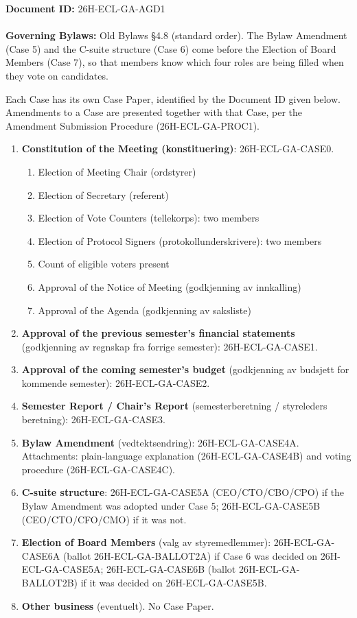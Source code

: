 \documentclass{../../../Common/Latex/Templates/rapport}
\date{\meetingdate, \meetingtime}
\begin{document}
\makecoverpage
\reportmainmatter

\noindent\textbf{Document ID:} 26H-ECL-GA-AGD1\\
\meetingline\\
\textbf{Governing Bylaws:} Old Bylaws \S4.8 (standard order). The Bylaw Amendment (Case 5) and the C-suite structure (Case 6) come before the Election of Board Members (Case 7), so that members know which four roles are being filled when they vote on candidates.

Each Case has its own Case Paper, identified by the Document ID given below. Amendments to a Case are presented together with that Case, per the Amendment Submission Procedure (26H-ECL-GA-PROC1).

\begin{enumerate}[label={\textbf{Case \arabic*.}}, leftmargin=*, itemsep=0.4em]
  \item \textbf{Constitution of the Meeting (konstituering)}: 26H-ECL-GA-CASE0.
        \begin{enumerate}[label=\alph*.]
          \item Election of Meeting Chair (ordstyrer)
          \item Election of Secretary (referent)
          \item Election of Vote Counters (tellekorps): two members
          \item Election of Protocol Signers (protokollunderskrivere): two members
          \item Count of eligible voters present
          \item Approval of the Notice of Meeting (godkjenning av innkalling)
          \item Approval of the Agenda (godkjenning av saksliste)
        \end{enumerate}
  \item \textbf{Approval of the previous semester's financial statements} (godkjenning av regnskap fra forrige semester): 26H-ECL-GA-CASE1.
  \item \textbf{Approval of the coming semester's budget} (godkjenning av budsjett for kommende semester): 26H-ECL-GA-CASE2.
  \item \textbf{Semester Report / Chair's Report} (semesterberetning / styreleders beretning): 26H-ECL-GA-CASE3.
  \item \textbf{Bylaw Amendment} (vedtektsendring): 26H-ECL-GA-CASE4A. Attachments: plain-language explanation (26H-ECL-GA-CASE4B) and voting procedure (26H-ECL-GA-CASE4C).
  \item \textbf{C-suite structure}: 26H-ECL-GA-CASE5A (CEO/CTO/CBO/CPO) if the Bylaw Amendment was adopted under Case 5; 26H-ECL-GA-CASE5B (CEO/CTO/CFO/CMO) if it was not.
  \item \textbf{Election of Board Members} (valg av styremedlemmer): 26H-ECL-GA-CASE6A (ballot 26H-ECL-GA-BALLOT2A) if Case 6 was decided on 26H-ECL-GA-CASE5A; 26H-ECL-GA-CASE6B (ballot 26H-ECL-GA-BALLOT2B) if it was decided on 26H-ECL-GA-CASE5B.
  \item \textbf{Other business} (eventuelt). No Case Paper.
\end{enumerate}
\end{document}
